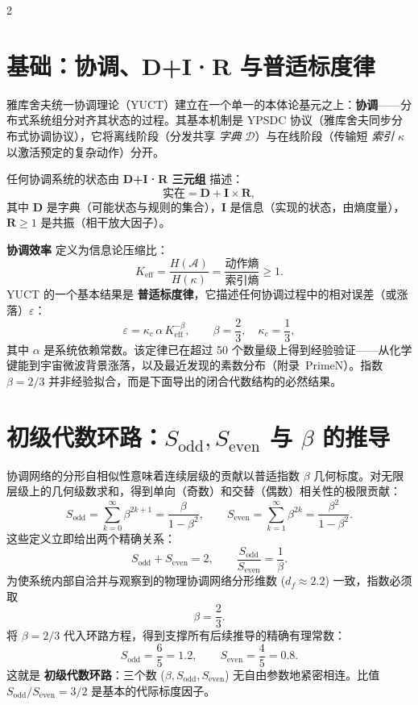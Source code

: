 \documentclass[12pt,a4paper]{article}
\newcommand{\Keff}{K_{\mathrm{eff}}}
\newcommand{\kappac}{\kappa_c}
\begin{document}
	\begin{multicols}{2}
		
		\section{基础：协调、D+I·R 与普适标度律}
		
		雅库舍夫统一协调理论（YUCT）建立在一个单一的本体论基元之上：\textbf{协调}——分布式系统组分对齐其状态的过程。其基本机制是 YPSDC 协议（雅库舍夫同步分布式协调协议），它将离线阶段（分发共享 \textit{字典} \(\mathcal{D}\)）与在线阶段（传输短 \textit{索引} \(\kappa\) 以激活预定的复杂动作）分开。
		
		任何协调系统的状态由 \textbf{D+I·R 三元组} 描述：
		\[
		\text{实在} = \mathbf{D} + \mathbf{I} \times \mathbf{R},
		\]
		其中 \(\mathbf{D}\) 是字典（可能状态与规则的集合），\(\mathbf{I}\) 是信息（实现的状态，由熵度量），\(\mathbf{R} \ge 1\) 是共振（相干放大因子）。
		
		\textbf{协调效率} 定义为信息论压缩比：
		\[
		\Keff = \frac{H(\mathcal{A})}{H(\kappa)} = \frac{\text{动作熵}}{\text{索引熵}} \ge 1.
		\]
		YUCT 的一个基本结果是 \textbf{普适标度律}，它描述任何协调过程中的相对误差（或涨落）\(\varepsilon\)：
		\[
		\boxed{\varepsilon = \kappac \, \alpha \, \Keff^{-\beta}, \qquad \beta = \frac{2}{3}, \quad \kappac = \frac{1}{3}},
		\]
		其中 \(\alpha\) 是系统依赖常数。该定律已在超过 50 个数量级上得到经验验证——从化学键能到宇宙微波背景涨落，以及最近发现的素数分布（附录~PrimeN）。指数 \(\beta = 2/3\) 并非经验拟合，而是下面导出的闭合代数结构的必然结果。
		
		\section{初级代数环路：\(S_{\mathrm{odd}}, S_{\mathrm{even}}\) 与 \(\beta\) 的推导}
		
		协调网络的分形自相似性意味着连续层级的贡献以普适指数 \(\beta\) 几何标度。对无限层级上的几何级数求和，得到单向（奇数）和交替（偶数）相关性的极限贡献：
		\begin{equation}
			S_{\mathrm{odd}} = \sum_{k=0}^{\infty} \beta^{2k+1} = \frac{\beta}{1-\beta^{2}}, \qquad
			S_{\mathrm{even}} = \sum_{k=1}^{\infty} \beta^{2k} = \frac{\beta^{2}}{1-\beta^{2}}.
		\end{equation}
		这些定义立即给出两个精确关系：
		\begin{equation}
			S_{\mathrm{odd}} + S_{\mathrm{even}} = 2, \qquad \frac{S_{\mathrm{odd}}}{S_{\mathrm{even}}} = \frac{1}{\beta}.
		\end{equation}
		为使系统内部自洽并与观察到的物理协调网络分形维数 (\(d_f \approx 2.2\)) 一致，指数必须取
		\begin{equation}
			\boxed{\beta = \frac{2}{3}}.
		\end{equation}
		将 \(\beta = 2/3\) 代入环路方程，得到支撑所有后续推导的精确有理常数：
		\begin{equation}
			\boxed{S_{\mathrm{odd}} = \frac{6}{5} = 1.2, \qquad S_{\mathrm{even}} = \frac{4}{5} = 0.8.}
		\end{equation}
		这就是 \textbf{初级代数环路}：三个数 (\(\beta, S_{\mathrm{odd}}, S_{\mathrm{even}}\)) 无自由参数地紧密相连。比值 \(S_{\mathrm{odd}}/S_{\mathrm{even}} = 3/2\) 是基本的代际标度因子。
		

\end{multicols}
\end{document}
